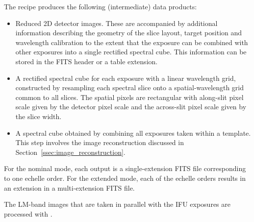 The recipe produces the following (intermediate) data products:
\begin{itemize}\item Reduced 2D detector images. These are accompanied by additional
  information describing the geometry of the slice layout, target
  position and wavelength calibration to the extent that the exposure can be
  combined with other exposures into a single rectified spectral cube.
  This information can be stored in the FITS header or a table
  extension.
\item A rectified spectral cube for each exposure with a linear
  wavelength grid, constructed by resampling each spectral slice onto
  a spatial-wavelength grid common to all slices. The spatial pixels
  are rectangular with along-slit pixel scale given by the detector
  pixel scale and the across-slit pixel scale given by the slice
  width.
\item A spectral cube obtained by combining all exposures taken within
  a template. This step involves the image reconstruction discussed in
  Section~\ref{ssec:image_reconstruction}.
\end{itemize}

For the nominal mode, each output is a single-extension FITS file
corresponding to one echelle order. For the extended mode, each of the
echelle orders results in an extension in a multi-extension FITS
file.


The LM-band images that are taken in parallel with the IFU exposures are
processed with .


